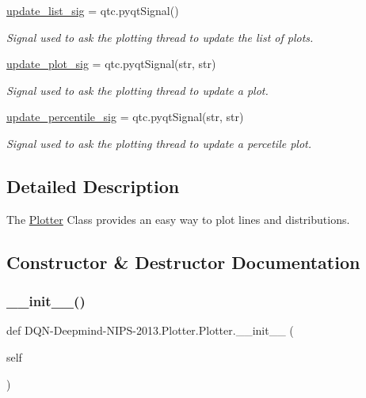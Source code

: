 \begin{DoxyCompactItemize}
\hyperlink{classDQN-Deepmind-NIPS-2013_1_1Plotter_1_1Plotter_aa6b7419c1641e98f1d050f4553becaf2}{update\+\_\+list\+\_\+sig} = qtc.\+pyqt\+Signal()
\begin{DoxyCompactList}\small\item\em Signal used to ask the plotting thread to update the list of plots. \end{DoxyCompactList}\item 
\hyperlink{classDQN-Deepmind-NIPS-2013_1_1Plotter_1_1Plotter_af89689f9142da4126b9c256efa69bec6}{update\+\_\+plot\+\_\+sig} = qtc.\+pyqt\+Signal(str, str)
\begin{DoxyCompactList}\small\item\em Signal used to ask the plotting thread to update a plot. \end{DoxyCompactList}\item 
\hyperlink{classDQN-Deepmind-NIPS-2013_1_1Plotter_1_1Plotter_a4d72a490c71c0bb118e8c76a665a4908}{update\+\_\+percentile\+\_\+sig} = qtc.\+pyqt\+Signal(str, str)
\begin{DoxyCompactList}\small\item\em Signal used to ask the plotting thread to update a percetile plot. \end{DoxyCompactList}\end{DoxyCompactItemize}


\subsection{Detailed Description}
The \hyperlink{classDQN-Deepmind-NIPS-2013_1_1Plotter_1_1Plotter}{Plotter} Class provides an easy way to plot lines and distributions. 

\subsection{Constructor \& Destructor Documentation}
\hypertarget{classDQN-Deepmind-NIPS-2013_1_1Plotter_1_1Plotter_a667c98c2620e83ae62d8cd9a9ba4e94c}{}\label{classDQN-Deepmind-NIPS-2013_1_1Plotter_1_1Plotter_a667c98c2620e83ae62d8cd9a9ba4e94c} 
\subsubsection{\texorpdfstring{\+\_\+\+\_\+init\+\_\+\+\_\+()}{\_\_init\_\_()}}
{\footnotesize\ttfamily def D\+QN-\/Deepmind-\/N\+I\+PS-\/2013.Plotter.\+Plotter.\+\_\+\+\_\+init\+\_\+\+\_\+ (\begin{DoxyParamCaption}\item[{}]{self }\end{DoxyParamCaption})}



